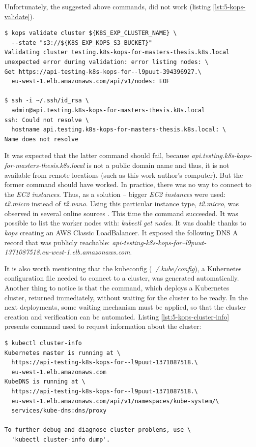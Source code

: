 Unfortunately, the suggested above commands, did not work (listing \ref{lst:5-kops-validate}).
\begin{lstlisting}[basicstyle=\scriptsize,xleftmargin=0cm,caption={Commands run to connect with a cluster created by \textit{kops} together with~output},label=lst:5-kops-validate]
$ kops validate cluster ${K8S_EXP_CLUSTER_NAME} \
  --state "s3://${K8S_EXP_KOPS_S3_BUCKET}"
Validating cluster testing.k8s-kops-for-masters-thesis.k8s.local
unexpected error during validation: error listing nodes: \
Get https://api-testing-k8s-kops-for--l9puut-394396927.\
  eu-west-1.elb.amazonaws.com/api/v1/nodes: EOF

$ ssh -i ~/.ssh/id_rsa \
  admin@api.testing.k8s-kops-for-masters-thesis.k8s.local
ssh: Could not resolve \
  hostname api.testing.k8s-kops-for-masters-thesis.k8s.local: \
Name does not resolve
\end{lstlisting}

It was expected that the latter command should fail, because \textit{api.testing.k8s-kops-for-masters-thesis.k8s.local} is not a public domain name and thus, it is not available from remote locations (such as this work author's computer). But the former command should have worked. In practice, there was no way to connect to the \textit{EC2 instances}. Thus, as a solution -- bigger \textit{EC2 instances} were used: \textit{t2.micro} instead of \textit{t2.nano}. Using this particular instance type, \textit{t2.micro}, was observed in several online sources \cite{online-perfect-k8s-blog,online-kops-sa,online-ha-k8s-blog}. This time the command succeeded. It was possible to list the worker nodes with: \textit{kubectl get nodes}. It was doable thanks to \textit{kops} creating an AWS Classic LoadBalancer. It exposed the following DNS A record that was publicly reachable: \textit{api-testing-k8s-kops-for--l9puut-1371087518.eu-west-1.elb.amazonaws.com}.

It is also worth mentioning that the kubeconfig (\textit{~/.kube/config}), a Kubernetes configuration file needed to connect to a cluster, was generated automatically. Another thing to notice is that the command, which deploys a Kubernetes cluster, returned immediately, without waiting for the cluster to be ready. In the next deployments, some waiting mechanism must be applied, so that the cluster creation and verification can be automated. Listing \ref{lst:5-kops-cluster-info} presents command used to request information about the cluster:
\begin{lstlisting}[basicstyle=\scriptsize,xleftmargin=0cm,caption={Command used to request information about a running Kubernetes cluster},label=lst:5-kops-cluster-info]
$ kubectl cluster-info
Kubernetes master is running at \
  https://api-testing-k8s-kops-for--l9puut-1371087518.\
  eu-west-1.elb.amazonaws.com
KubeDNS is running at \
  https://api-testing-k8s-kops-for--l9puut-1371087518.\
  eu-west-1.elb.amazonaws.com/api/v1/namespaces/kube-system/\
  services/kube-dns:dns/proxy

To further debug and diagnose cluster problems, use \
  'kubectl cluster-info dump'.
\end{lstlisting}

